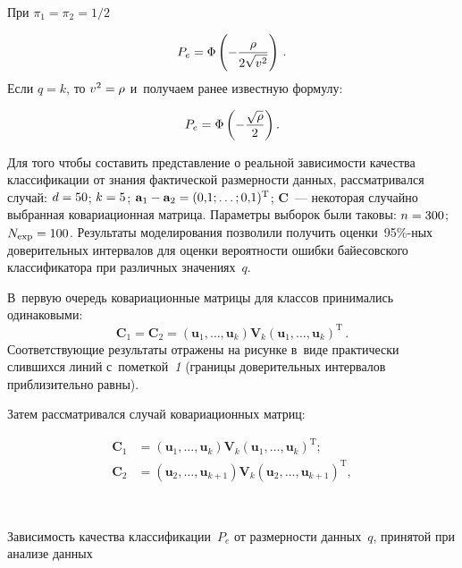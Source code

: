 \begin{multicols}{2}
     При $\pi_1=\pi_2=1/2$
     
     \noindent
     $$
     P_e=\Phi\left( -\displaystyle\frac{\displaystyle \rho\mathstrut}{\displaystyle 2\sqrt{v^2}\mathstrut}\right)\,.
     $$
     Если $q=k$, то $v^2\hm=\rho$ и~получаем ранее известную формулу:
     
     \noindent
$$
P_e=\Phi\left(-
\displaystyle\frac{\displaystyle \sqrt{\rho}\mathstrut}{\displaystyle 2\mathstrut}\right).
$$
     
     Для того чтобы составить представление о реальной зависимости 
качества классификации от знания фактической размерности данных, 
рассматривался случай: $d\hm=50$; $k\hm=5$;  $\mathbf{a}_1\hm-
\mathbf{a}_2\hm=(0{,}1; \ldots ; 0{,}1)^{\mathrm{T}}$; $\mathbf{C}$~--- 
некоторая случайно выбранная ковариационная матрица. Параметры выборок 
были таковы: $n\hm=300$; $N_{\mathrm{exp}}\hm=100$. Результаты моделирования 
позволили получить оценки~95\%-ных доверительных интервалов для оценки 
вероятности ошибки байесовского классификатора при различных значениях~$q$. 

В~первую очередь ковариационные матрицы для классов принимались 
одинаковыми: 
$$
\mathbf{C}_1=\mathbf{C}_2= (\mathbf{u}_1,\ldots 
,\mathbf{u}_k)\mathbf{V}_k(\mathbf{u}_1,\ldots , \mathbf{u}_k)^{\mathrm{T}}\,.
$$ 
Соответствующие результаты отражены на рисунке в~виде практически 
слившихся линий с~пометкой~\textit{1} (границы доверительных интервалов 
приблизительно равны).

Затем рассматривался случай ковариационных матриц: 

\noindent
\begin{align*}
\mathbf{C}_1&= (\mathbf{u}_1, \ldots ,\mathbf{u}_k)\mathbf{V}_k 
(\mathbf{u}_1, \ldots ,\mathbf{u}_k)^{\mathrm{T}};\\
\mathbf{C}_2&= 
(\mathbf{u}_2, \ldots ,\mathbf{u}_{k+1})\mathbf{V}_k (\mathbf{u}_2, \ldots 
,\mathbf{u}_{k+1})^{\mathrm{T}},
\end{align*}

{ \begin{center}  %
 \vspace*{6pt}
  \mbox{%
 \epsfxsize=77.961mm 
 }


\end{center}

\vspace*{-3pt}

\noindent
{\small{Зависимость качества классификации~$P_e$ от размерности 
данных~$q$, принятой при анализе данных}}
}

\pagebreak


\end{multicols}
